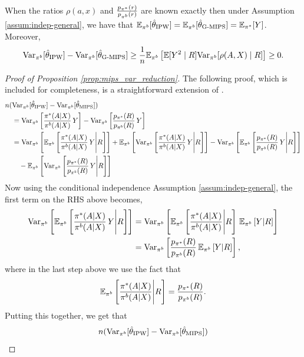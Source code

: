 \begin{proposition}\label{prop:mips_var_reduction}
    When the ratios $\rho(a, x)$ and $\frac{p_{\pi^*}(r)}{p_{\pi^b}(r)}$ are known exactly then under Assumption \ref{assum:indep-general}, we have that $\mathbb{E}_{\pi^b}[\hat{\theta}_{\textup{IPW}}] = \mathbb{E}_{\pi^b}[\hat{\theta}_{\textup{G-MIPS}}] = \mathbb{E}_{\pi^*}[Y]$. Moreover,
\begin{align*}
     \textup{Var}_{\pi^b}[\hat{\theta}_{\textup{IPW}}] - \textup{Var}_{\pi^b}[\hat{\theta}_{\textup{G-MIPS}}]
    \geq \frac{1}{n}\mathbb{E}_{\pi^b} \left[ \mathbb{E}[Y^2\mid R] \textup{Var}_{\pi^b}[\rho(A, X)\mid R] \right] \geq 0.
\end{align*}
\end{proposition}

\begin{proof}[Proof of Proposition \ref{prop:mips_var_reduction}]
The following proof, which is included for completeness, is a straightforward extension of \cite[Theorem 3.6]{saito2022off}. 
\begin{align*}
    &n (\textup{Var}_{\pi^b}[\hat{\theta}_{\textup{IPW}}] - \textup{Var}_{\pi^b}[\hat{\theta}_{\textup{MIPS}}])\\
    &\quad= \textup{Var}_{\pi^b}\left[\frac{\pi^*(A|X)}{\pi^b(A|X)}\,Y\right] - \textup{Var}_{\pi^b}\left[\frac{p_{\pi^*}(R)}{p_{\pi^b}(R)}\,Y \right]\\
     &\quad= \textup{Var}_{\pi^b}\left[\mathbb{E}_{\pi^b}\left[\frac{\pi^*(A|X)}{\pi^b(A|X)}\,Y \Bigg| R\right]\right] + \mathbb{E}_{\pi^b}\left[ \textup{Var}_{\pi^b}\left[\frac{\pi^*(A|X)}{\pi^b(A|X)}\,Y\Bigg| R \right]\right] - \textup{Var}_{\pi^b}\left[\mathbb{E}_{\pi^b}\left[ \frac{p_{\pi^*}(R)}{p_{\pi^b}(R)}\,Y \Bigg| R\right]\right]\\
     &\qquad- \mathbb{E}_{\pi^b}\left[\textup{Var}_{\pi^b}\left[ \frac{p_{\pi^*}(R)}{p_{\pi^b}(R)}\,Y \Bigg| R\right]\right]
\end{align*}
Now using the conditional independence Assumption \ref{assum:indep-general}, the first term on the RHS above becomes,
\begin{align*}
    \textup{Var}_{\pi^b}\left[\mathbb{E}_{\pi^b}\left[\frac{\pi^*(A|X)}{\pi^b(A|X)}\,Y \Bigg| R\right]\right] &= \textup{Var}_{\pi^b}\left[\mathbb{E}_{\pi^b}\left[\frac{\pi^*(A|X)}{\pi^b(A|X)}\Bigg| R\right]\,\mathbb{E}_{\pi^b}\left[Y | R\right]\right]\\
    &= \textup{Var}_{\pi^b}\left[\frac{p_{\pi^*}(R)}{p_{\pi^b}(R)}\,\mathbb{E}_{\pi^b}\left[Y | R\right]\right],
\end{align*}
where in the last step above we use the fact that
\begin{align*}
    \mathbb{E}_{\pi^b}\left[\frac{\pi^*(A|X)}{\pi^b(A|X)}\Bigg| R\right] = \frac{p_{\pi^*}(R)}{p_{\pi^b}(R)}.
\end{align*}
Putting this together, we get that
\begin{align}
    &n (\Vbeh[\thetaipw] - \Vbeh[\hat{\theta}_{\textup{MIPS}}]) \nonumber\\ 

\end{align}
\end{proof}
